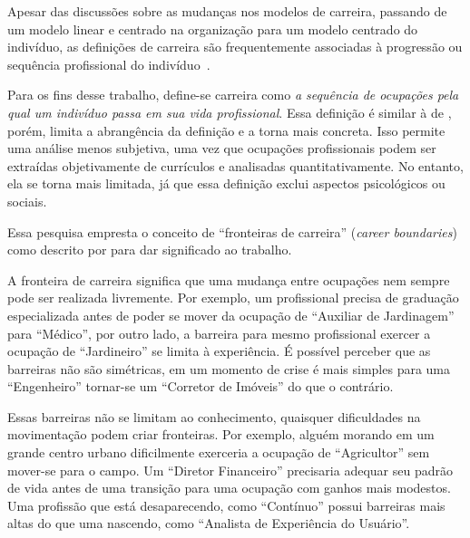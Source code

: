 \documentclass[
  article,
  11pt,
  a4paper,
  english,
  brazil,
  sumario=tradicional]{abntex2}
\begin{document}
Apesar das discussões sobre as mudanças nos modelos de carreira, passando de um modelo linear e centrado na organização para um modelo centrado do indivíduo, as definições de carreira são frequentemente associadas à progressão ou sequência profissional do indivíduo~\cite{Baruch2004-oy,Sullivan2009-xb,Bendassolli2009-bg}.

Para os fins desse trabalho, define-se carreira como \textit{a sequência de ocupações pela qual um indivíduo passa em sua vida profissional}. Essa definição é similar à de , porém, limita a abrangência da definição e a torna mais concreta. Isso permite uma análise menos subjetiva, uma vez que ocupações profissionais podem ser extraídas objetivamente de currículos e analisadas quantitativamente. No entanto, ela se torna mais limitada, já que essa definição exclui aspectos psicológicos ou sociais.

Essa pesquisa empresta o conceito de \enquote{fronteiras de carreira} (\textit{career boundaries}) como descrito por   para dar significado ao trabalho.

A fronteira de carreira significa que uma mudança entre ocupações nem sempre pode ser realizada livremente. Por exemplo, um profissional precisa de graduação especializada antes de poder se mover da ocupação de \enquote{Auxiliar de Jardinagem} para \enquote{Médico}, por outro lado, a barreira para mesmo profissional exercer a ocupação de \enquote{Jardineiro} se limita à experiência. É possível perceber que as barreiras não são simétricas, em um momento de crise é mais simples para uma \enquote{Engenheiro} tornar-se um \enquote{Corretor de Imóveis} do que o contrário.

Essas barreiras não se limitam ao conhecimento, quaisquer dificuldades na movimentação podem criar fronteiras. Por exemplo, alguém morando em um grande centro urbano dificilmente exerceria a ocupação de \enquote{Agricultor} sem mover-se para o campo. Um \enquote{Diretor Financeiro} precisaria adequar seu padrão de vida antes de uma transição para uma ocupação com ganhos mais modestos. Uma profissão que está desaparecendo, como \enquote{Contínuo} possui barreiras mais altas do que uma nascendo, como \enquote{Analista de Experiência do Usuário}.
\end{document}
